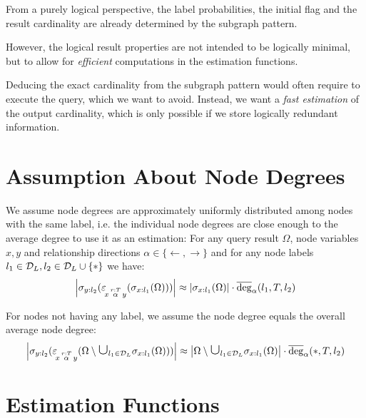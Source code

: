 \begin{remark}
From a purely logical perspective, the label probabilities, the initial flag
and the result cardinality are already determined by the subgraph pattern.

However, the logical result properties are not intended to be logically
minimal, but to allow for \emph{efficient} computations in the estimation
functions.

Deducing the exact cardinality from the subgraph pattern would often
require to execute the query, which we want to avoid.
Instead, we want a \emph{fast estimation} of the output cardinality,
which is only possible if we store logically redundant information.
\end{remark}

\section{Assumption About Node Degrees}

We assume node degrees are approximately uniformly distributed among
nodes with the same label, i.e. the individual node degrees are close
enough to the average degree to use it as an estimation:
For any query result $\Omega$, node variables $x, y$ and relationship
directions $\alpha \in \{ \leftarrow, \rightarrow \}$ and for any node labels
$l_1 \in \mathcal{D}_L, l_2 \in \mathcal{D}_L \cup \{ * \}$ we have:
\begin{align}
  \card{\selection{y:l_2}(\expandvar{x}{r:T}{\alpha}{y}(
                       \selection{x:l_1}(\Omega)
                     ))}
  \approx
    \card{\selection{x:l_1}(\Omega)} \cdot \avgdeg_\alpha(l_1, T, l_2)
  \label{ass:uniformity-1}
\end{align}

For nodes not having any label, we assume the node degree equals the overall
average node degree:
\begin{align}
  \card{\selection{y:l_2}(\expandvar{x}{r:T}{\alpha}{y}(
     \Omega \setminus \bigunion_{l_1 \in \nlabels} \selection{x:l_1}(\Omega)
  ))}
  \approx
    \card{\Omega \setminus
      \bigunion_{l_1 \in \nlabels} \selection{x:l_1}(\Omega)}
    \cdot \avgdeg_\alpha(*, T, l_2)
  \label{ass:uniformity-2}
\end{align}

\section{Estimation Functions}

